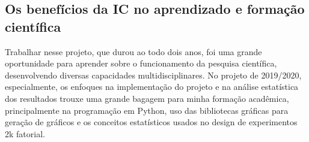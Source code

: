 
\begin{anexosenv}
\partanexos   %
\chapter{Os benefícios da IC no aprendizado e formação científica}

Trabalhar nesse projeto, que durou ao todo dois anos, foi uma grande oportunidade para aprender sobre o funcionamento da pesquisa científica, desenvolvendo diversas capacidades multidisciplinares. No projeto de 2019/2020, especialmente, os enfoques na implementação do projeto e na análise estatística dos resultados trouxe uma grande bagagem para minha formação acadêmica, principalmente na programação em Python, uso das bibliotecas gráficas para geração de gráficos e os conceitos estatísticos usados no design de experimentos 2k fatorial.


\end{anexosenv}
